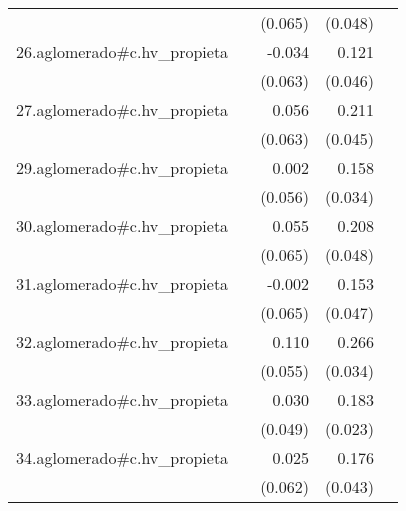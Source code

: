 {\begin{longtable}{l*{4}{D{.}{.}{-1}}}
            &                     &     (0.065)         &     (0.048)         &                     \\
\addlinespace
26.aglomerado#c.hv\_propieta&                     &      -0.034         &       0.121\sym{**} &                     \\
            &                     &     (0.063)         &     (0.046)         &                     \\
\addlinespace
27.aglomerado#c.hv\_propieta&                     &       0.056         &       0.211\sym{***}&                     \\
            &                     &     (0.063)         &     (0.045)         &                     \\
\addlinespace
29.aglomerado#c.hv\_propieta&                     &       0.002         &       0.158\sym{***}&                     \\
            &                     &     (0.056)         &     (0.034)         &                     \\
\addlinespace
30.aglomerado#c.hv\_propieta&                     &       0.055         &       0.208\sym{***}&                     \\
            &                     &     (0.065)         &     (0.048)         &                     \\
\addlinespace
31.aglomerado#c.hv\_propieta&                     &      -0.002         &       0.153\sym{**} &                     \\
            &                     &     (0.065)         &     (0.047)         &                     \\
\addlinespace
32.aglomerado#c.hv\_propieta&                     &       0.110\sym{*}  &       0.266\sym{***}&                     \\
            &                     &     (0.055)         &     (0.034)         &                     \\
\addlinespace
33.aglomerado#c.hv\_propieta&                     &       0.030         &       0.183\sym{***}&                     \\
            &                     &     (0.049)         &     (0.023)         &                     \\
\addlinespace
34.aglomerado#c.hv\_propieta&                     &       0.025         &       0.176\sym{***}&                     \\
            &                     &     (0.062)         &     (0.043)         &                     \\

\end{longtable}}
